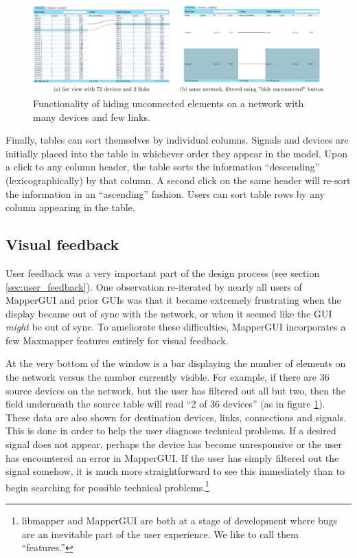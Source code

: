 \begin{figure}
	\centering
	\includegraphics[width=1\textwidth]{figures/hide_unconnected}
\caption{Functionality of hiding unconnected elements on a network with many devices and few links.}
\label{fig:hide_unconnected}
\end{figure}

Finally, tables can sort themselves by individual columns. Signals and devices are initially placed into the table in whichever order they appear in the model. Upon a click to any column header, the table sorts the information ``descending'' (lexicographically) by that column. A second click on the same header will re-sort the information in an ``ascending'' fashion. Users can sort table rows by any column appearing in the table.


	\subsection{Visual feedback} %
	\label{sub:visual_feedback}

User feedback was a very important part of the design process (see section \ref{sec:user_feedback}). One observation re-iterated by nearly all users of MapperGUI and prior GUIs was that it became extremely frustrating when the display became out of sync with the network, or when it seemed like the GUI \emph{might} be out of sync. To ameliorate these difficulties, MapperGUI incorporates a few Maxmapper features entirely for visual feedback.
		
At the very bottom of the window is a bar displaying the number of elements on the network versus the number currently visible. For example, if there are 36 source devices on the network, but the user has filtered out all but two, then the field underneath the source table will read ``2 of 36 devices'' (as in figure \ref{fig:hide_unconnected}). These data are also shown for destination devices, links, connections and signals. This is done in order to help the user diagnose technical problems. If a desired signal does not appear, perhaps the device has become unresponsive or the user has encountered an error in MapperGUI. If the user has simply filtered out the signal somehow, it is much more straightforward to see this immediately than to begin searching for possible technical problems.\footnote{libmapper and MapperGUI are both at a stage of development where bugs are an inevitable part of the user experience. We like to call them ``features.''}

